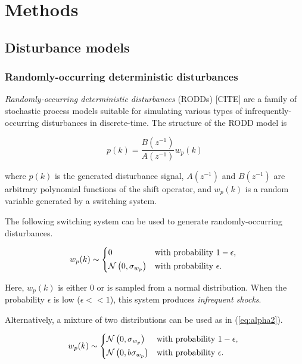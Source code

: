 \chapter{Methods}
\label{chap-methods}

\section{Disturbance models}

\subsection{Randomly-occurring deterministic disturbances}

\textit{Randomly-occurring deterministic disturbances} (RODDs) [CITE] are a family of stochastic process models suitable for simulating various types of infrequently-occurring disturbances in discrete-time.  The structure of the RODD model is

\begin{equation} \label{eq:RODD}
	p(k)= \frac{B(z^{-1})}{A(z^{-1})}w_p(k)
\end{equation}

where $p(k)$ is the generated disturbance signal, $A(z^{-1})$ and $B(z^{-1})$ are arbitrary polynomial functions of the shift operator, and $w_p(k)$ is a random variable generated by a switching system.

The following switching system can be used to generate randomly-occurring disturbances.

\begin{equation} \label{eq:alpha1}
w_p(k) \sim 
\begin{cases*}
	0 & with probability $1-\epsilon$, \\
	\mathcal{N}\left(0, \sigma_{w_p}\right) & with probability $\epsilon$.
\end{cases*}
\end{equation}

Here, $w_p(k)$ is either 0 or is sampled from a normal distribution.  When the probability $\epsilon$ is low ($\epsilon<<1$), this system produces \textit{infrequent shocks}.

Alternatively, a mixture of two distributions can be used as in (\ref{eq:alpha2}).

\begin{equation} \label{eq:alpha2}
w_p(k) \sim 
	\begin{cases*}
		\mathcal{N}\left(0, \sigma_{w_p}\right) & with probability $1-\epsilon$, \\
		\mathcal{N}\left(0, b\sigma_{w_p}\right) & with probability $\epsilon$.
	\end{cases*}
\end{equation}

